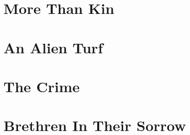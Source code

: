 \documentclass[a5paper,12pt,twoside,onecolumn,openright,showtrim]{memoir}
\begin{document}
\cleartorecto
\part{More Than Kin}

\clearforchapter

\cleartorecto
\part{An Alien Turf}

\clearforchapter

\cleartorecto
\part{The Crime}

\clearforchapter

\cleartorecto
\part{Brethren In Their Sorrow}

\clearforchapter
\backmatter
\end{document}
